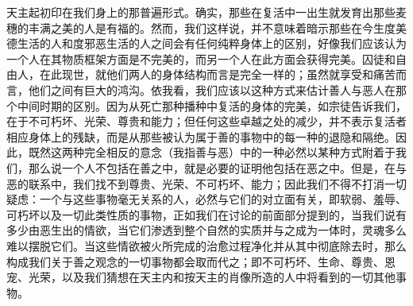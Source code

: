 天主起初印在我们身上的那普遍形式。确实，那些在复活中一出生就发育出那些麦穗的丰满之美的人是有福的。然而，我们这样说，并不意味着暗示那些在今生度美德生活的人和度邪恶生活的人之间会有任何纯粹身体上的区别，好像我们应该认为一个人在其物质框架方面是不完美的，而另一个人在此方面会获得完美。囚徒和自由人，在此现世，就他们两人的身体结构而言是完全一样的；虽然就享受和痛苦而言，他们之间有巨大的鸿沟。依我看，我们应该以这种方式来估计善人与恶人在那个中间时期的区别。因为从死亡那种播种中复活的身体的完美，如宗徒告诉我们，在于不可朽坏、光荣、尊贵和能力；但任何这些卓越之处的减少，并不表示复活者相应身体上的残缺，而是从那些被认为属于善的事物中的每一种的退隐和隔绝。因此，既然这两种完全相反的意念（我指善与恶）中的一种必然以某种方式附着于我们，那么说一个人不包括在善之中，就是必要的证明他包括在恶之中。但是，在与恶的联系中，我们找不到尊贵、光荣、不可朽坏、能力；因此我们不得不打消一切疑虑：一个与这些事物毫无关系的人，必然与它们的对立面有关，即软弱、羞辱、可朽坏以及一切此类性质的事物，正如我们在讨论的前面部分提到的，当我们说有多少由恶生出的情欲，当它们渗透到整个自然的实质并与之成为一体时，灵魂多么难以摆脱它们。当这些情欲被火所完成的治愈过程净化并从其中彻底除去时，那么构成我们关于善之观念的一切事物都会取而代之；即不可朽坏、生命、尊贵、恩宠、光荣，以及我们猜想在天主内和按天主的肖像所造的人中将看到的一切其他事物。\par

